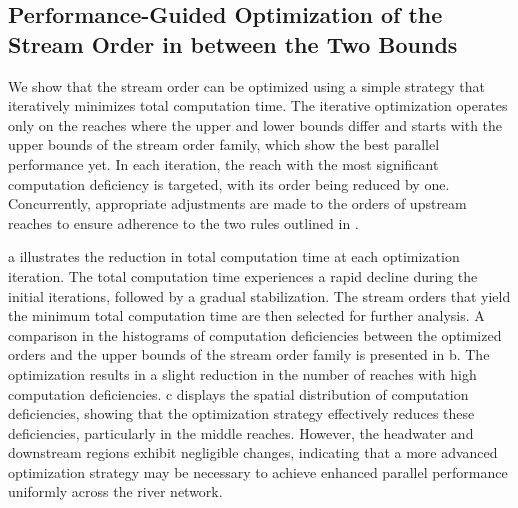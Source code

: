 \documentclass[water,article,submit,pdftex,moreauthors]{Definitions/mdpi}
\begin{document}
\subsection{Performance-Guided Optimization of the Stream Order in between the Two Bounds}
\label{sec:optimization_yangtze}

We show that the stream order can be optimized using a simple strategy that iteratively minimizes total computation time. The iterative optimization operates only on the reaches where the upper and lower bounds differ and starts with the upper bounds of the stream order family, which show the best parallel performance yet. In each iteration, the reach with the most significant computation deficiency is targeted, with its order being reduced by one. Concurrently, appropriate adjustments are made to the orders of upstream reaches to ensure adherence to the two rules outlined in .

a illustrates the reduction in total computation time at each optimization iteration. The total computation time experiences a rapid decline during the initial iterations, followed by a gradual stabilization. The stream orders that yield the minimum total computation time are then selected for further analysis. A comparison in the histograms of computation deficiencies between the optimized orders and the upper bounds of the stream order family is presented in b. The optimization results in a slight reduction in the number of reaches with high computation deficiencies. c displays the spatial distribution of computation deficiencies, showing that the optimization strategy effectively reduces these deficiencies, particularly in the middle reaches. However, the headwater and downstream regions exhibit negligible changes, indicating that a more advanced optimization strategy may be necessary to achieve enhanced parallel performance uniformly across the river network.
\end{document}
